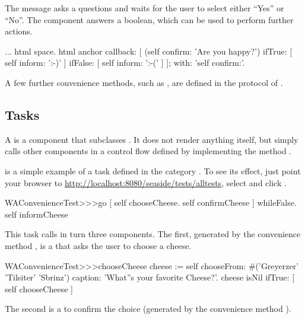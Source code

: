 \documentclass[a4paper,10pt,twoside]{book}
\begin{document}
The message  asks a questions and waits for the user to select either ``Yes'' or ``No''.
The component answers a boolean, which can be used to perform further actions.

\begin{code}{}
...
	html space.
	html anchor
		callback: [
			(self confirm: 'Are you happy?')
				ifTrue: [ self inform: ':-)' ]
				ifFalse: [ self inform: ':-(' ]
			];
		with: 'self confirm:'.
\end{code}

A few further convenience methods, such as , are defined in the  protocol of .

\subsection{Tasks}

A  is a component that subclasses .
It does not render anything itself, but simply calls other components in a control flow defined by implementing the method .

 is a simple example of a task defined in the category .
To see its effect, just point your browser to \url{http://localhost:8080/seaside/tests/alltests}, select  and click .

\begin{code}{}
WAConvenienceTest>>>go
	[ self chooseCheese.
	  self confirmCheese ] whileFalse.
	self informCheese
\end{code}

This task calls in turn three components.
The first, generated by the convenience method , is a  that asks the user to choose a cheese.

\begin{code}{}
WAConvenienceTest>>>chooseCheese
	cheese := self
		chooseFrom: #('Greyerzer' 'Tilsiter' 'Sbrinz')
		caption: 'What''s your favorite Cheese?'.
	cheese isNil ifTrue: [ self chooseCheese ]
\end{code}


The second is a  to confirm the choice (generated by the convenience method ).
\end{document}
